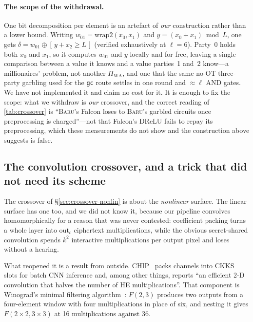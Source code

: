 \documentclass[11pt]{article}
\newcommand{\bt}[1]{\texttt{#1}}
\newcommand{\Baru}{\textsc{Baru}}
\begin{document}
\paragraph{The scope of the withdrawal.} One bit decomposition per element is an
artefact of \emph{our} construction rather than a lower bound. Writing
$w_{01} = \mathrm{wrap2}(x_0,x_1)$ and $y = (x_0+x_1) \bmod L$, one gets
$\delta = w_{01} \oplus [\,y + x_2 \geq L\,]$ (verified exhaustively at
$\ell = 6$). Party~0 holds both $x_0$ and $x_1$, so it computes $w_{01}$ and $y$
locally and for free, leaving a single comparison between a value it knows and a
value parties~1 and~2 know---a millionaires' problem, not another
$\Pi_{\mathrm{WA}}$, and one that the same no-OT three-party garbling used for the
\bt{gc} route settles in one round and ${\approx}\ell$ AND gates. We have not
implemented it and claim no cost for it. It is enough to fix the scope: what we
withdraw is \emph{our} crossover, and the correct reading of
\cref{tab:crossover} is ``\Baru{}'s Falcon loses to \Baru{}'s garbled circuits once
preprocessing is charged''---not that Falcon's DReLU fails to repay its
preprocessing, which these measurements do not show and the construction above
suggests is false.

\subsection{The convolution crossover, and a trick that did not need its scheme}
\label{sec:crossover-conv}

The crossover of \S\ref{sec:crossover-nonlin} is about the \emph{nonlinear} surface. The linear
surface has one too, and we did not know it, because our pipeline convolves homomorphically for a
reason that was never contested: coefficient packing turns a whole layer into $\mathrm{out}_c$
ciphertext multiplications, while the obvious secret-shared convolution spends $k^2$ interactive
multiplications per output pixel and loses without a hearing.

What reopened it is a result from outside. CHIP~\cite{CHIP} packs channels into CKKS slots for
batch CNN inference and, among other things, reports ``an efficient 2-D convolution that halves the
number of HE multiplications''. That component is Winograd's minimal filtering
algorithm~\cite{Winograd,LavinGray}: $F(2,3)$ produces two outputs from a four-element window with
four multiplications in place of six, and nesting it gives $F(2\times2, 3\times3)$ at \num{16}
multiplications against \num{36}.
\end{document}
